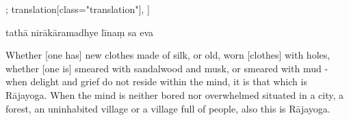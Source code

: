 \begin{alignment}[
  texts=edition[class="edition"];
  translation[class="translation"],
  ]
\begin{edition}
\begin{prose}[p18_01]
tathā
nirākāramadhye līnaṃ
sa eva
\dd{}
\end{prose}
\end{edition}
  \begin{translation}
    \begin{tlate}[p17_02]
      \noindent
Whether [one has] new clothes made of silk, or old, worn [clothes] with holes, whether [one is] smeared with sandalwood and musk, or smeared with mud - when delight and grief do not reside within the mind, it is that which is Rājayoga. When the mind is neither bored nor overwhelmed situated in a city, a forest, an uninhabited village or a village full of people, also this is Rājayoga. 
\end{tlate}
      \label{caryayogatrans}
     \begin{tlate}[p18_01]

\end{tlate}
\end{translation}
\end{alignment}
